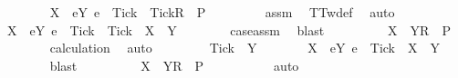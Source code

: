 \begin{isabellebody}
\ \ \ \ \isamarkupfalse%
\ {\isachardoublequoteopen}{\isasymrho}\ {\isacharat}\ {\isacharbrackleft}{\isacharbrackleft}X\ {\isasymunion}\ {\isacharbraceleft}e{\isasymin}Y{\isachardot}\ e\ {\isasymnoteq}\ Tick{\isacharbraceright}\ {\isasymunion}\ {\isacharbraceleft}Tick{\isacharbraceright}{\isacharbrackright}\isactrlsub R{\isacharbrackright}\ {\isasymin}\ P{\isachardoublequoteclose}\isanewline
\ \ \ \ \ \ \isamarkupfalse%
\ {}\ assm{}\ \isamarkupfalse%
\ TT{}w{\isacharunderscore}def\ \isamarkupfalse%
\ auto\isanewline
\ \ \ \ \isamarkupfalse%
\ \isamarkupfalse%
\ {\isachardoublequoteopen}X\ {\isasymunion}\ {\isacharbraceleft}e{\isasymin}Y{\isachardot}\ e\ {\isasymnoteq}\ Tick{\isacharbraceright}\ {\isasymunion}\ {\isacharbraceleft}Tick{\isacharbraceright}\ {\isacharequal}\ X\ {\isasymunion}\ Y{\isachardoublequoteclose}\isanewline
\ \ \ \ \ \ \isamarkupfalse%
\ case{\isacharunderscore}assm\ \isamarkupfalse%
\ blast\isanewline
\ \ \ \ \isamarkupfalse%
\ \isamarkupfalse%
\ {\isachardoublequoteopen}{\isasymrho}\ {\isacharat}\ {\isacharbrackleft}{\isacharbrackleft}X\ {\isasymunion}\ Y{\isacharbrackright}\isactrlsub R{\isacharbrackright}\ {\isasymin}\ P{\isachardoublequoteclose}\isanewline
\ \ \ \ \ \ \isamarkupfalse%
\ calculation\ \isamarkupfalse%
\ auto\isanewline
\ \ \isamarkupfalse%
\isanewline
\ \ \ \ \isamarkupfalse%
\ {\isachardoublequoteopen}Tick\ {\isasymnotin}\ Y{\isachardoublequoteclose}\isanewline
\ \ \ \ \isamarkupfalse%
\ \isamarkupfalse%
\ {\isachardoublequoteopen}X\ {\isasymunion}\ {\isacharbraceleft}e{\isasymin}Y{\isachardot}\ e\ {\isasymnoteq}\ Tick{\isacharbraceright}\ {\isacharequal}\ X\ {\isasymunion}\ Y{\isachardoublequoteclose}\isanewline
\ \ \ \ \ \ \isamarkupfalse%
\ blast\isanewline
\ \ \ \ \isamarkupfalse%
\ \isamarkupfalse%
\ {\isachardoublequoteopen}{\isasymrho}\ {\isacharat}\ {\isacharbrackleft}{\isacharbrackleft}X\ {\isasymunion}\ Y{\isacharbrackright}\isactrlsub R{\isacharbrackright}\ {\isasymin}\ P{\isachardoublequoteclose}\isanewline
\ \ \ \ \ \ \isamarkupfalse%
\ {}\ \isamarkupfalse%
\ auto\isanewline
\ \ \isamarkupfalse%
\isanewline
{}\isamarkupfalse%
\isanewline
\ \ \isamarkupfalse%

\end{isabellebody}
